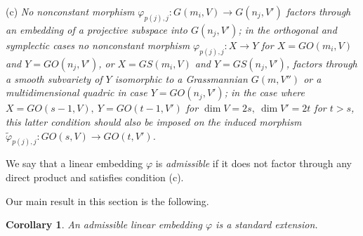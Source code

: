\documentclass[12pt]{amsart}
\renewcommand{\phi}{\varphi}
\newtheorem{corollary}[theorem]{Corollary}
\theoremstyle{definition}
\begin{document}
(c) \textit{No nonconstant morphism $\phi_{p(j),j}:G(m_i,V)\to 
G(n_j,V')$ factors through an embedding of a projective 
subspace into $G(n_j,V')$; in the orthogonal and symplectic 
cases no nonconstant morphism $\phi_{p(j),j}:X\to Y$ for 
$X=GO(m_i,V)$ and $Y=GO(n_j,V')$, or $X=GS(m_i,V)$ and 
$Y=GS(n_j,V')$, factors through a smooth subvariety of $Y$ 
isomorphic to a Grassmannian $G(m,V'')$ or a multidimensional 
quadric in case $Y=GO(n_j,V')$; in the case where $X=GO(s-1,V)
,\ Y=GO(t-1,V')$ for $\dim V=2s,\ \dim V'=2t$ for $t>s$, this 
latter condition should also be imposed on the induced 
morphism $\tilde{\phi}_{p(j),j}:GO(s,V)\to GO(t,V')$.}

We say that a linear embedding $\phi$ is \textit{admissible} if
it does not factor through any direct product and satisfies
condition (c).

Our main result in this section is the following.

\begin{corollary}\label{Cor 4.4}
An admissible linear embedding $\phi$ is a standard extension.
\end{corollary}
\end{document}
